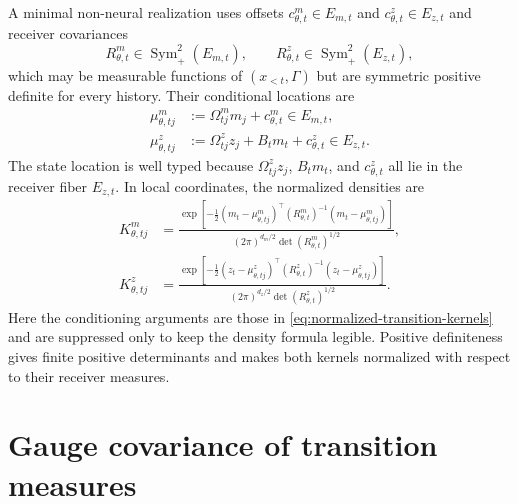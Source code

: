 A minimal non-neural realization uses offsets $c_{\theta,t}^m\in E_{m,t}$ and $c_{\theta,t}^z\in E_{z,t}$ and receiver covariances
\begin{equation}
R_{\theta,t}^m\in\operatorname{Sym}_+^2(E_{m,t}),
\qquad
R_{\theta,t}^z\in\operatorname{Sym}_+^2(E_{z,t}),
\label{eq:receiver-spd-transition-covariances}
\end{equation}
which may be measurable functions of $(x_{<t},\Gamma)$ but are symmetric positive definite for every history.  Their conditional locations are
\begin{equation}
\begin{aligned}
\mu^m_{\theta,tj}
&:=\Omega^m_{tj}m_j+c_{\theta,t}^m
\in E_{m,t},\\
\mu^z_{\theta,tj}
&:=\Omega^z_{tj}z_j+B_tm_t+c_{\theta,t}^z
\in E_{z,t}.
\end{aligned}
\label{eq:typed-gaussian-transition-locations}
\end{equation}
The state location is well typed because $\Omega^z_{tj}z_j$, $B_tm_t$, and $c_{\theta,t}^z$ all lie in the receiver fiber $E_{z,t}$.  In local coordinates, the normalized densities are
\begin{equation}
\begin{aligned}
K^m_{\theta,tj}
&=\frac{\exp\left[-\tfrac12
(m_t-\mu^m_{\theta,tj})^\top
(R_{\theta,t}^m)^{-1}
(m_t-\mu^m_{\theta,tj})\right]}
{(2\pi)^{d_m/2}\det(R_{\theta,t}^m)^{1/2}},\\
K^z_{\theta,tj}
&=\frac{\exp\left[-\tfrac12
(z_t-\mu^z_{\theta,tj})^\top
(R_{\theta,t}^z)^{-1}
(z_t-\mu^z_{\theta,tj})\right]}
{(2\pi)^{d_z/2}\det(R_{\theta,t}^z)^{1/2}}.
\end{aligned}
\label{eq:normalized-gaussian-transition-densities}
\end{equation}
Here the conditioning arguments are those in \cref{eq:normalized-transition-kernels} and are suppressed only to keep the density formula legible.  Positive definiteness gives finite positive determinants and makes both kernels normalized with respect to their receiver measures.

\section{Gauge covariance of transition measures}

